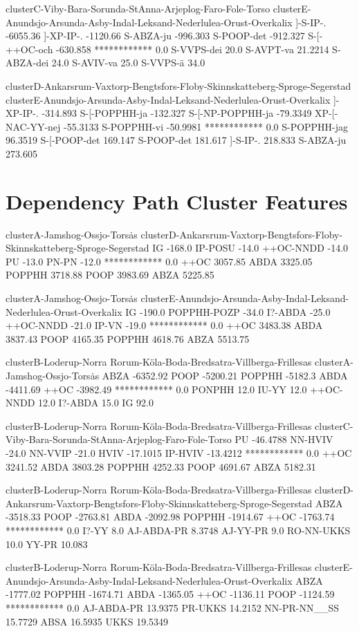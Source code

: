 clusterC-Viby-Bara-Sorunda-StAnna-Arjeplog-Faro-Fole-Torso
clusterE-Anundsjo-Arsunda-Asby-Indal-Leksand-Nederlulea-Orust-Overkalix
]-S-IP-. -6055.36
]-XP-IP-. -1120.66
S-ABZA-ju -996.303
S-POOP-det -912.327
S-[-++OC-och -630.858
************ 0.0
S-VVPS-dei 20.0
S-AVPT-va 21.2214
S-ABZA-dei 24.0
S-AVIV-va 25.0
S-VVPS-\"a 34.0

clusterD-Ankarsrum-Vaxtorp-Bengtsfors-Floby-Skinnskatteberg-Sproge-Segerstad
clusterE-Anundsjo-Arsunda-Asby-Indal-Leksand-Nederlulea-Orust-Overkalix
]-XP-IP-. -314.893
S-[-POPPHH-ja -132.327
S-[-NP-POPPHH-ja -79.3349
XP-[-NAC-YY-nej -55.3133
S-POPPHH-vi -50.9981
************ 0.0
S-POPPHH-jag 96.3519
S-[-POOP-det 169.147
S-POOP-det 181.617
]-S-IP-. 218.833
S-ABZA-ju 273.605

\section{Dependency Path Cluster Features}

clusterA-Jamshog-Ossjo-Tors\.as
clusterD-Ankarsrum-Vaxtorp-Bengtsfors-Floby-Skinnskatteberg-Sproge-Segerstad
IG -168.0
IP-POSU -14.0
++OC-NNDD -14.0
PU -13.0
PN-PN -12.0
************ 0.0
++OC 3057.85
ABDA 3325.05
POPPHH 3718.88
POOP 3983.69
ABZA 5225.85

clusterA-Jamshog-Ossjo-Tors\.as
clusterE-Anundsjo-Arsunda-Asby-Indal-Leksand-Nederlulea-Orust-Overkalix
IG -190.0
POPPHH-POZP -34.0
I?-ABDA -25.0
++OC-NNDD -21.0
IP-VN -19.0
************ 0.0
++OC 3483.38
ABDA 3837.43
POOP 4165.35
POPPHH 4618.76
ABZA 5513.75

clusterB-Loderup-Norra Rorum-K\"ola-Boda-Bredsatra-Villberga-Frillesas
clusterA-Jamshog-Ossjo-Tors\.as
ABZA -6352.92
POOP -5200.21
POPPHH -5182.3
ABDA -4411.69
++OC -3982.49
************ 0.0
PONPHH 12.0
IU-YY 12.0
++OC-NNDD 12.0
I?-ABDA 15.0
IG 92.0

clusterB-Loderup-Norra Rorum-K\"ola-Boda-Bredsatra-Villberga-Frillesas
clusterC-Viby-Bara-Sorunda-StAnna-Arjeplog-Faro-Fole-Torso
PU -46.4788
NN-HVIV -24.0
NN-VVIP -21.0
HVIV -17.1015
IP-HVIV -13.4212
************ 0.0
++OC 3241.52
ABDA 3803.28
POPPHH 4252.33
POOP 4691.67
ABZA 5182.31

clusterB-Loderup-Norra Rorum-K\"ola-Boda-Bredsatra-Villberga-Frillesas
clusterD-Ankarsrum-Vaxtorp-Bengtsfors-Floby-Skinnskatteberg-Sproge-Segerstad
ABZA -3518.33
POOP -2763.81
ABDA -2092.98
POPPHH -1914.67
++OC -1763.74
************ 0.0
I?-YY 8.0
AJ-ABDA-PR 8.3748
AJ-YY-PR 9.0
RO-NN-UKKS 10.0
YY-PR 10.083

clusterB-Loderup-Norra Rorum-K\"ola-Boda-Bredsatra-Villberga-Frillesas
clusterE-Anundsjo-Arsunda-Asby-Indal-Leksand-Nederlulea-Orust-Overkalix
ABZA -1777.02
POPPHH -1674.71
ABDA -1365.05
++OC -1136.11
POOP -1124.59
************ 0.0
AJ-ABDA-PR 13.9375
PR-UKKS 14.2152
NN-PR-NN\_\_SS 15.7729
ABSA 16.5935
UKKS 19.5349

